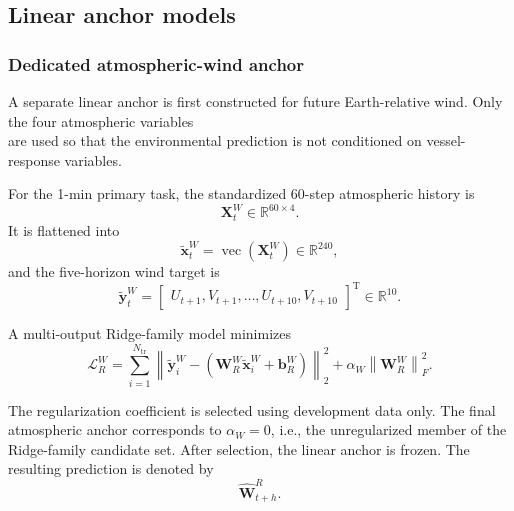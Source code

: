 \subsection{Linear anchor models}
\label{subsec:linear_anchors}

\subsubsection{Dedicated atmospheric-wind anchor}
\label{subsubsec:wind_anchor}

A separate linear anchor is first constructed for future Earth-relative wind. Only the four atmospheric variables
\begin{equation}
[U,V,T,RH]
\end{equation}
are used so that the environmental prediction is not conditioned on vessel-response variables.

For the 1-min primary task, the standardized 60-step atmospheric history is
\begin{equation}
\mathbf X_t^{W}
\in
\mathbb R^{60\times4}.
\end{equation}
It is flattened into
\begin{equation}
\tilde{\mathbf x}_t^{W}
=
\operatorname{vec}
\left(
\mathbf X_t^{W}
\right)
\in
\mathbb R^{240},
\label{eq:wind_flat_input}
\end{equation}
and the five-horizon wind target is
\begin{equation}
\tilde{\mathbf y}_t^{W}
=
\begin{bmatrix}
U_{t+1},
V_{t+1},
\ldots,
U_{t+10},
V_{t+10}
\end{bmatrix}^{\mathrm T}
\in
\mathbb R^{10}.
\label{eq:wind_flat_target}
\end{equation}

A multi-output Ridge-family model \cite{Hoerl1970} minimizes
\begin{equation}
\mathcal L_R^W
=
\sum_{i=1}^{N_{\mathrm{tr}}}
\left\|
\tilde{\mathbf y}_i^W
-
\left(
\mathbf W_R^W
\tilde{\mathbf x}_i^W
+
\mathbf b_R^W
\right)
\right\|_2^2
+
\alpha_W
\left\|
\mathbf W_R^W
\right\|_F^2.
\label{eq:wind_ridge_loss}
\end{equation}

The regularization coefficient is selected using development data only. The final atmospheric anchor corresponds to $\alpha_W=0$, i.e., the unregularized member of the Ridge-family candidate set. After selection, the linear anchor is frozen. The resulting prediction is denoted by
\begin{equation}
\hat{\mathbf W}^{R}_{t+h}.
\label{eq:wind_ridge_pred}
\end{equation}

